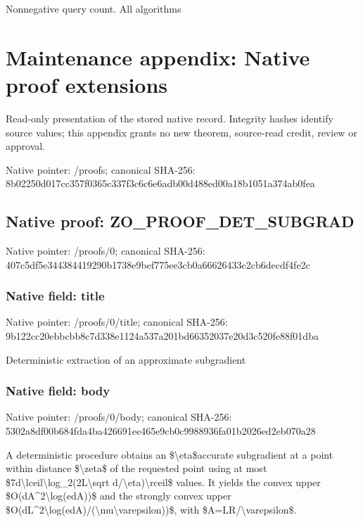 \documentclass[10pt,a4paper]{article}
\begin{document}
Nonnegative query count. All algorithms



\section{Maintenance appendix: Native proof extensions}


Read-only presentation of the stored native record. Integrity hashes identify source values; this appendix grants no new theorem, source-read credit, review or approval.



Native pointer: /proofs; canonical SHA-256: 8b02250d017cc357f0365c33\allowbreak{}7f3c6c6e6adb00d488ed00a1\allowbreak{}8b1051a374ab0fea



\subsection{Native proof: ZO\_PROOF\_DET\_SUBGRAD}


Native pointer: /proofs/0; canonical SHA-256: 407c5df5e344384419290b17\allowbreak{}38e9bef775ee3cb0a6662643\allowbreak{}3c2cb6decdf4fe2c



\subsubsection{Native field: title}


Native pointer: /proofs/0/title; canonical SHA-256: 9b122cc20ebbcbb8c7d338e1\allowbreak{}124a537a201bd66352037e20\allowbreak{}d3c520fe88f01dba


Deterministic extraction of an approximate subgradient


\subsubsection{Native field: body}


Native pointer: /proofs/0/body; canonical SHA-256: 5302a8df00b684fda4ba4266\allowbreak{}91ee465e9cb0c9988936fa01\allowbreak{}b2026ed2eb070a28


A deterministic procedure obtains an \$\textbackslash{}eta\$accurate subgradient at a point within distance \$\textbackslash{}zeta\$ of the requested point using at most \$7d\textbackslash{}lceil\textbackslash{}log\_2(2L\textbackslash{}sqrt d/\textbackslash{}eta)\textbackslash{}rceil\$ values. It yields the convex upper \$O(dA\textasciicircum{}2\textbackslash{}log(edA))\$ and the strongly convex upper \$O(dL\textasciicircum{}2\textbackslash{}log(edA)/(\textbackslash{}mu\textbackslash{}varepsilon))\$, with \$A=LR/\textbackslash{}varepsilon\$.
\end{document}
